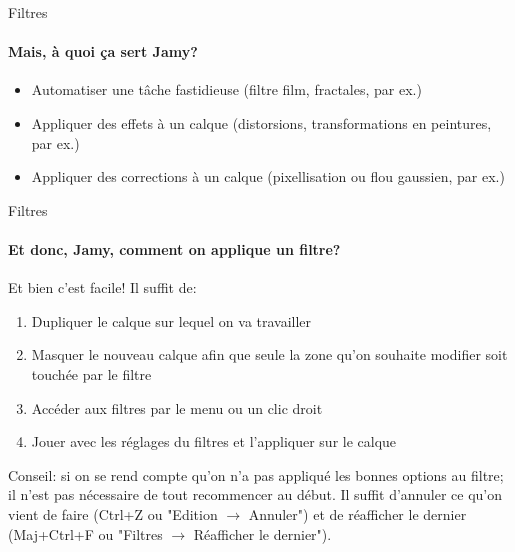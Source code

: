 \documentclass[10pt,svgnames,usenames,table]{beamer}
\begin{document}
	\begin{frame}{Filtres}
		\framesubtitle{Mais, à quoi ça sert Jamy?}
			\begin{itemize}
			\item Automatiser une tâche fastidieuse (filtre film, fractales, par ex.)
			\item Appliquer des effets à un calque (distorsions, transformations en peintures, par ex.)
			\item Appliquer des corrections à un calque (pixellisation ou flou gaussien, par ex.)
			\end{itemize}				
	\end{frame}		

	\begin{frame}{Filtres}
		\framesubtitle{Et donc, Jamy, comment on applique un filtre?}		
		Et bien c'est facile! Il suffit de: 
		\begin{enumerate}
			\item Dupliquer le calque sur lequel on va travailler
			\item Masquer le nouveau calque afin que seule la zone qu'on souhaite modifier soit touchée par le filtre
			\item Accéder aux filtres par le menu ou un clic droit
			\item Jouer avec les réglages du filtres et l'appliquer sur le calque
		\end{enumerate}

		Conseil: si on se rend compte qu'on n'a pas appliqué les bonnes options au filtre; il n'est pas nécessaire de tout recommencer au début. Il suffit d'annuler ce qu'on vient de faire (Ctrl+Z ou "Edition $\rightarrow$ Annuler") et de réafficher le dernier (Maj+Ctrl+F ou "Filtres $\rightarrow$ Réafficher le dernier").		
		
	\end{frame}
\end{document}
